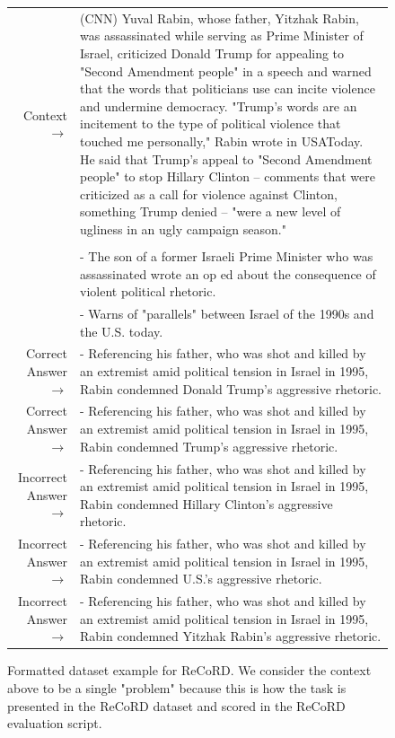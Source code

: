 \begin{figure} { \tt \footnotesize \begin{tabularx}{\linewidth}{r X} 
\toprule 
Context $\to$ & (CNN) Yuval Rabin, whose father, Yitzhak Rabin, was assassinated while serving as Prime Minister of Israel, criticized Donald Trump for appealing to "Second Amendment people" in a speech and warned that the words that politicians use can incite violence and undermine democracy. "Trump's words are an incitement to the type of political violence that touched me personally," Rabin wrote in USAToday. He said that Trump's appeal to "Second Amendment people" to stop Hillary Clinton -- comments that were criticized as a call for violence against Clinton, something Trump denied -- "were a new level of ugliness in an ugly campaign season." \\
& \\
&   - The son of a former Israeli Prime Minister who was assassinated wrote an op ed about the consequence of violent political rhetoric. \\
&   - Warns of "parallels" between Israel of the 1990s and the U.S. today. \\
\midrule 
 Correct Answer $\to$ & - Referencing his father, who was shot and killed by an extremist amid political tension in Israel in 1995, Rabin condemned Donald Trump's aggressive rhetoric. \\ 
 
 Correct Answer $\to$ & - Referencing his father, who was shot and killed by an extremist amid political tension in Israel in 1995, Rabin condemned Trump's aggressive rhetoric. \\ 
 
 Incorrect Answer $\to$ & - Referencing his father, who was shot and killed by an extremist amid political tension in Israel in 1995, Rabin condemned Hillary Clinton's aggressive rhetoric. \\
  Incorrect Answer $\to$ & - Referencing his father, who was shot and killed by an extremist amid political tension in Israel in 1995, Rabin condemned U.S.'s aggressive rhetoric. \\
 Incorrect Answer $\to$ & - Referencing his father, who was shot and killed by an extremist amid political tension in Israel in 1995, Rabin condemned Yitzhak Rabin's aggressive rhetoric. \\ 
 \bottomrule \end{tabularx} }   

 \caption{Formatted dataset example for ReCoRD. We consider the context above to be a single "problem" because this is how the task is presented in the ReCoRD dataset and scored in the ReCoRD evaluation script.}

\label{eval:ReCoRD}  \end{figure}%
